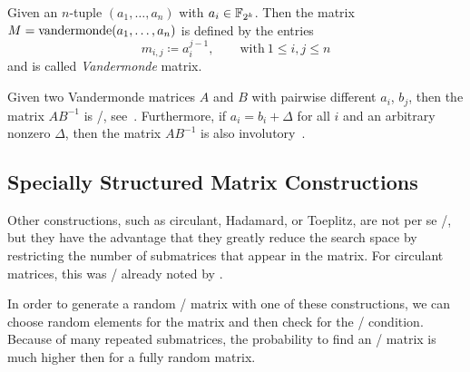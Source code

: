 \begin{definition}
    Given an $n$-tuple $(a_1,\ldots,a_n)$ with $a_i \in \mathbb{F}_{2^k}$.
    Then the matrix $M = \operatorname{vandermonde}(a_1, \ldots, a_n)$ is defined by the entries
    \begin{equation*}
        m_{i,j} \coloneqq a_i^{j-1}, \qquad \text{with}\ 1 \leq i,j \leq n
    \end{equation*}
    and is called \emph{Vandermonde} matrix.
\end{definition}

Given two Vandermonde matrices $A$ and $B$ with pairwise different $a_i$, $b_j$, then the matrix $AB^{-1}$ is \MDS/, see~\cite[Theorem 2]{CL:LacFim04}.
Furthermore, if $a_i = b_i + \Delta$ for all $i$ and an arbitrary nonzero $\Delta$, then the matrix $AB^{-1}$ is also involutory~\cite{CL:LacFim04,DCC:SDMO12}.

\subsection{Specially Structured Matrix Constructions}

Other constructions, such as circulant, Hadamard, or Toeplitz, are not per se \MDS/, but they have the advantage that they greatly reduce the search space by restricting the number of submatrices that appear in the matrix.
For circulant matrices, this was \eg/ already noted by \textcite{FSE:DaeKnuRij97}.

In order to generate a random \MDS/ matrix with one of these constructions, we can choose random elements for the matrix and then check for the \MDS/ condition.
Because of many repeated submatrices, the probability to find an \MDS/ matrix is much higher then for a fully random matrix.

